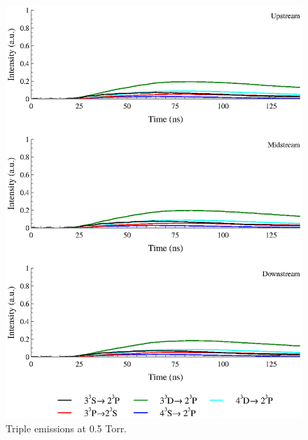 \begin{figure}
  \centering
  \includegraphics{./chapters/extraem/figures/05torr_t.eps}
  \caption{Triple emissions at 0.5 Torr.}
\end{figure}

